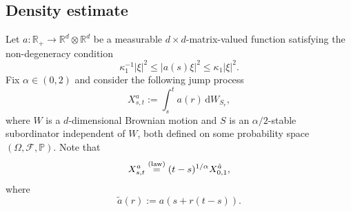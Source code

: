 \documentclass[JEP,XML,SOM,Unicode,published]{cedram}
\theoremstyle{plain}
\theoremstyle{definition}
\newcommand\mR{\mathbb{R}}
\newcommand\1{{\mathbf{1}}}
\newcommand{\dif}{\,\mathrm{d}}
\begin{document}
\subsection{Density estimate }
\label{SEC_DENS_EST}
Let $a:\mR_+\to\mR^d\otimes\mR^d$ be a measurable $d\times d$-matrix-valued function satisfying
the non-degeneracy condition
\begin{equation}\label{AA4}
\kappa_1^{-1}|\xi|^2\leq |a(s)\xi|^2\leq \kappa_1|\xi|^2.
\end{equation}
Fix $\alpha\in (0,2)$ and consider the following jump process
\begin{equation}\label{SUB_INTEGRAL}
X^a_{s,t}:=\int^t_sa(r)\dif W_{S_r},
\end{equation}
where $ W$ is a $d$-dimensional Brownian motion and $S$ is an $\alpha/2$-stable subordinator independent of $W$, both defined on some probability space $(\Omega,\mathcal F,\mathbb P) $. Note that
\[
X^a_{s,t}\stackrel{\textup{(law)}}{=}(t-s)^{1/\alpha}X^{\tilde a}_{0,1},
\]
where
\[
\tilde a(r):=a(s+r(t-s)).
\]
\end{document}
